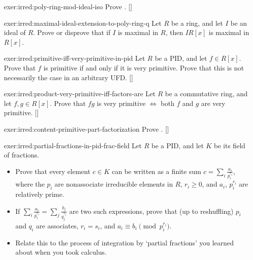 \begin{exer}{}{exer:irred:poly-ring-mod-ideal-iso}
  \exerused{} Prove
  . []
\end{exer}
\begin{exer}{}{exer:irred:maximal-ideal-extension-to-poly-ring-q}
  Let $R$ be a ring, and let $I$ be an ideal of $R$. Prove or disprove
  that if $I$ is maximal in $R$, then $IR[x]$ is maximal in $R[x]$.
\end{exer}
\begin{exer}{}{exer:irred:primitive-iff-very-primitive-in-pid}
  \exerused{} Let $R$ be a PID, and let $f \in R[x]$. Prove that $f$
  is primitive if and only if it is very primitive. Prove that this is
  not necessarily the case in an arbitrary
  UFD. []
\end{exer}
\begin{exer}{}{exer:irred:product-very-primitive-iff-factors-are}
  \exerused{} Let $R$ be a commutative ring, and let $f, g \in R[x]$.
  Prove that $fg$ is very primitive $\iff$ both $f$ and $g$ are very
  primitive. []
\end{exer}
\begin{exer}{}{exer:irred:content-primitive-part-factorization}
  \exerused{} Prove
  . []
\end{exer}
\begin{exer}{}{exer:irred:partial-fractions-in-pid-frac-field}
  Let $R$ be a PID, and let $K$ be its field of fractions.
  \begin{itemize}
  \item Prove that every element $c \in K$ can be written as a finite
    sum $c = \sum_i \frac{a_i}{p_i^{r_i}}$, where the $p_i$ are
    nonassociate irreducible elements in $R$, $r_i \geq 0$, and $a_i$,
    $p_i^{r_i}$ are relatively prime.
  \item If
    $\sum_i \frac{a_i}{p_i^{r_i}} = \sum_j \frac{b_j}{q_j^{s_j}}$ are
    two such expressions, prove that (up to reshuffling) $p_i$ and
    $q_i$ are associates, $r_i = s_i$, and
    $a_i \equiv b_i \pmod{p_i^{r_i}}$.
  \item Relate this to the process of integration by `partial
    fractions' you learned about when you took calculus.
  \end{itemize}
\end{exer}
